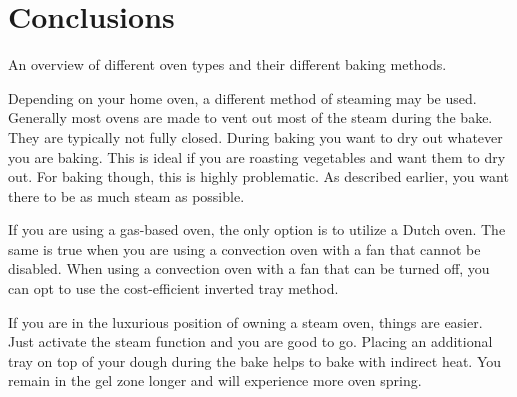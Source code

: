 \section{Conclusions}

\begin{table}[!htb]
    \begin{center}
        
        \caption{An overview of different oven types and their different
        baking methods.}
    \end{center}
\end{table}

Depending on your home oven, a different method
of steaming may be used. Generally most ovens
are made to vent out most of the steam during the
bake. They are typically not fully closed. During
baking you want to dry out whatever you are baking.
This is ideal if you are roasting vegetables and
want them to dry out. For baking though, this is
highly problematic. As described earlier, you
want there to be as much steam as possible.

If you are using a gas-based oven, the only option
is to utilize a Dutch oven. The same is true when you
are using a convection oven with a fan that
cannot be disabled. When using a convection
oven with a fan that can be turned off, you can
opt to use the cost-efficient inverted tray
method.

If you are in the luxurious
position of owning a steam oven, things are easier.
Just activate the steam function and you are
good to go. Placing an additional tray on top of your
dough during the bake helps to bake with indirect
heat. You remain in the gel zone longer and
will experience more oven spring.
